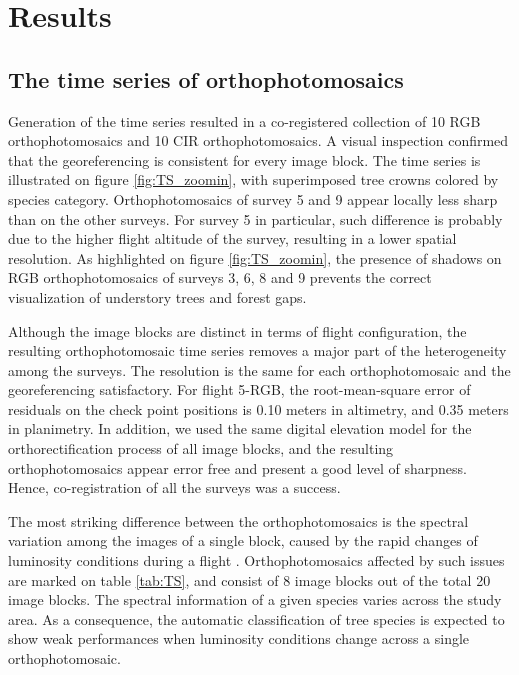 \documentclass[remotesensing,article,submit,moreauthors,pdftex,12pt,a4paper]{mdpi} %
\begin{document}
\section{Results}

\subsection{The time series of orthophotomosaics}

Generation of the time series resulted in a co-registered collection of 10 RGB orthophotomosaics and 10 CIR orthophotomosaics. 
A visual inspection confirmed that the georeferencing is consistent for every image block. 
The time series is illustrated on figure \ref{fig:TS_zoomin}, with superimposed tree crowns colored by species category. 
Orthophotomosaics of survey 5 and 9 appear locally less sharp than on the other surveys. 
For survey 5 in particular, such difference is probably due to the higher flight altitude of the survey, resulting in a lower spatial resolution.
As highlighted on figure \ref{fig:TS_zoomin}, the presence of shadows on RGB orthophotomosaics of surveys 3, 6, 8 and 9 prevents the correct visualization of understory trees and forest gaps.

Although the image blocks are distinct in terms of flight configuration, the resulting orthophotomosaic time series removes a major part of the heterogeneity among the surveys. 
The resolution is the same for each orthophotomosaic and the georeferencing satisfactory. 
For flight 5-RGB, the root-mean-square error of residuals on the check point positions is 0.10 meters in altimetry, and 0.35 meters in planimetry. %
In addition, we used the same digital elevation model for the orthorectification process of all image blocks, and the resulting orthophotomosaics appear error free and present a good level of sharpness.  
Hence, co-registration of all the surveys was a success. 

The most striking difference between the orthophotomosaics is the spectral variation among the images of a single block, caused by the rapid changes of luminosity conditions during a flight \cite{honkavaara_digital_2009}. 
Orthophotomosaics affected by such issues are marked on table \ref{tab:TS}, and consist of 8 image blocks out of the total 20 image blocks. 
The spectral information of a given species varies across the study area. As a consequence, the automatic classification of tree species is expected to show weak performances when luminosity conditions change across a single orthophotomosaic.
\end{document}
